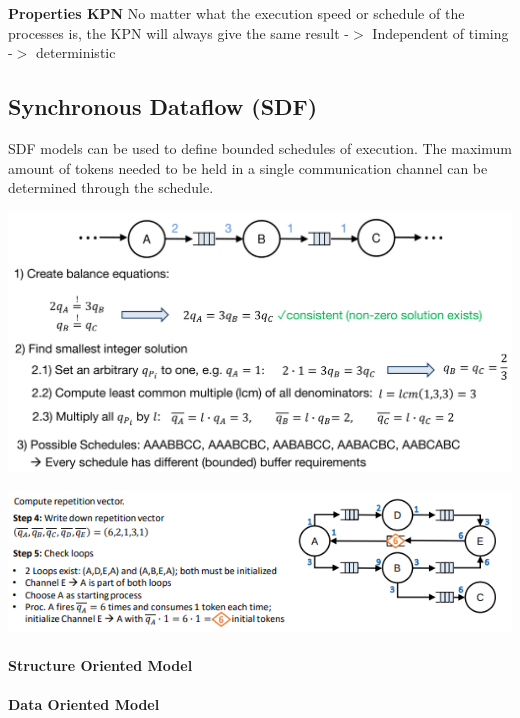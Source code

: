 \documentclass[english]{latex4ei/latex4ei_sheet}
\begin{document}
\textbf{Properties KPN} No matter what the execution speed or schedule of the processes is, the KPN will always give the same result -$>$ Independent of timing -$>$ deterministic

\subsection{Synchronous Dataflow (SDF)}
SDF models can be used to define bounded schedules of execution. The maximum amount of
tokens needed to be held in a single communication channel can be determined through the
schedule.

\begin{center}
  \includegraphics[width=\linewidth]{assets/SDFExample.png}
  \label{fig:sdfexample}
\end{center}
 
\begin{center}
  \includegraphics[width=\linewidth]{assets/SDFExample2.png}
  \label{fig:sdfexample2}
\end{center}

\paragraph{Structure Oriented Model}

\paragraph{Data Oriented Model}
\end{document}
